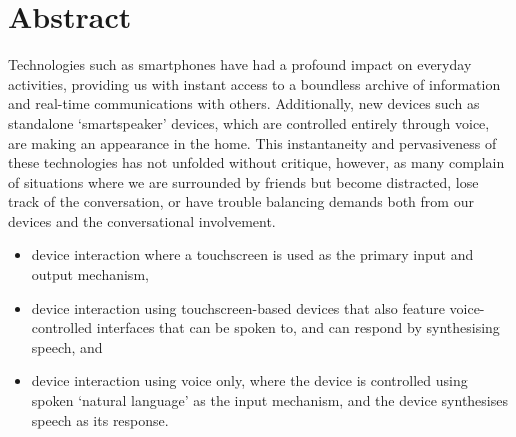 


\begingroup
\let\clearpage\relax
\let\cleardoublepage\relax
\let\cleardoublepage\relax

\chapter*{Abstract}
Technologies such as smartphones have had a profound impact on everyday activities, providing us with instant access to a boundless archive of information and real-time communications with others.
Additionally, new devices such as standalone `smartspeaker' devices, which are controlled entirely through voice, are making an appearance in the home.
This instantaneity and pervasiveness of these technologies has not unfolded without critique, however, as many complain of situations where we are surrounded by friends but become distracted, lose track of the conversation, or have trouble balancing demands both from our devices and the conversational involvement.


\begin{itemize}
\item device interaction where a touchscreen is used as the primary input and output mechanism,
\item device interaction using touchscreen-based devices that also feature voice-controlled interfaces that can be spoken to, and can respond by synthesising speech, and
\item device interaction using voice only, where the device is controlled using spoken `natural language' as the input mechanism, and the device synthesises speech as its response.
\end{itemize}


